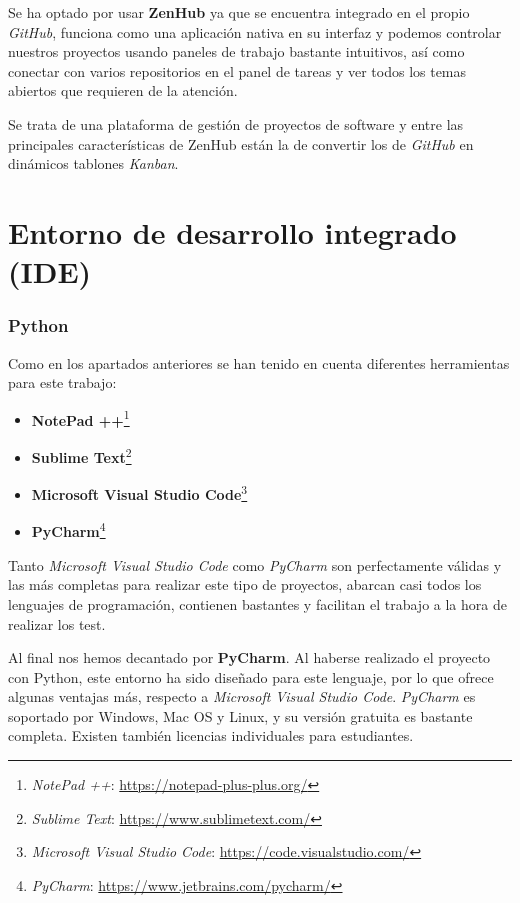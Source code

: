 Se ha optado por usar  \textbf {ZenHub} ya que se encuentra integrado en el propio \emph{GitHub}, funciona como una aplicación nativa en su interfaz y podemos controlar nuestros proyectos usando paneles de trabajo bastante intuitivos, así como conectar con varios repositorios en el panel de tareas y ver todos los temas abiertos que requieren de la atención.

Se trata de una plataforma de gestión de proyectos de software y entre las principales características de ZenHub están la de convertir los  de \emph{GitHub} en dinámicos tablones \emph{Kanban}.

\section{Entorno de desarrollo integrado (IDE)}


\subsubsection{Python}

Como en los apartados anteriores se han tenido en cuenta diferentes herramientas para este trabajo:
\begin{itemize}
\item \textbf{NotePad ++}\footnote{\textsl{NotePad ++}: \url{https://notepad-plus-plus.org/}}
\item \textbf{Sublime Text}\footnote{\textsl{Sublime Text}: \url{https://www.sublimetext.com/}}
\item \textbf{Microsoft Visual Studio Code}\footnote{\textsl{Microsoft Visual Studio Code}: \url{https://code.visualstudio.com/}}
\item \textbf{PyCharm}\footnote{\textsl{PyCharm}: \url{https://www.jetbrains.com/pycharm/}}

\end{itemize}

Tanto \emph{Microsoft Visual Studio Code} como \emph{PyCharm} son perfectamente válidas y las más completas para realizar este tipo de proyectos, abarcan casi todos los lenguajes de programación, contienen bastantes  y facilitan el trabajo a la hora de realizar los test.

Al final nos hemos decantado por \textbf{PyCharm}. Al haberse realizado el proyecto con Python, este entorno ha sido diseñado para este lenguaje, por lo que ofrece algunas ventajas más, respecto a \emph{Microsoft Visual Studio Code}. \emph{PyCharm} es soportado por Windows, Mac OS y Linux, y su versión gratuita es bastante completa. Existen también licencias individuales para estudiantes.



